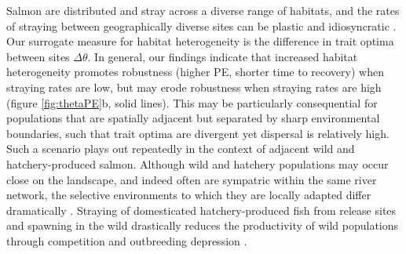 \documentclass{revtex4}
\begin{document}
Salmon are distributed and stray across a diverse range of habitats, and the rates of straying between geographically diverse sites can be plastic and idiosyncratic \citep{Westley:2015to}.
Our surrogate measure for habitat heterogeneity is the difference in trait optima between sites $\Delta\theta$.
In general, our findings indicate that increased habitat heterogeneity promotes robustness (higher PE, shorter time to recovery) when straying rates are low, but may erode robustness when straying rates are high (figure \ref{fig:thetaPE}b, solid lines).
This may be particularly consequential for populations that are spatially adjacent but separated by sharp environmental boundaries, such that trait optima are divergent yet dispersal is relatively high.
Such a scenario plays out repeatedly in the context of adjacent wild and hatchery-produced salmon. 
Although wild and hatchery populations may occur close on the landscape, and indeed often are sympatric within the same river network, the selective environments to which they are locally adapted differ dramatically \citep{Christie:2012bj}. 
Straying of domesticated hatchery-produced fish from release sites and spawning in the wild drastically reduces the productivity of wild populations through competition and outbreeding depression \citep{Chilcote:2003bb,Araki:2007cm}.
\end{document}
